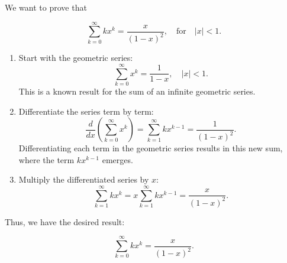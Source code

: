     \begin{example}
        We want to prove that

        \[
        \sum_{k=0}^{\infty} k x^k = \frac{x}{(1-x)^2}, \quad \text{for} \quad |x| < 1.
        \]

        \begin{enumerate}
            \item Start with the geometric series:
            \[
            \sum_{k=0}^{\infty} x^k = \frac{1}{1-x}, \quad |x| < 1.
            \]
            This is a known result for the sum of an infinite geometric series.

            \item Differentiate the series term by term:
            \[
            \frac{d}{dx} \left( \sum_{k=0}^{\infty} x^k \right) = \sum_{k=1}^{\infty} k x^{k-1} = \frac{1}{(1-x)^2}.
            \]
            Differentiating each term in the geometric series results in this new sum, where the term \( k x^{k-1} \) emerges.

            \item Multiply the differentiated series by \( x \):
            \[
            \sum_{k=1}^{\infty} k x^k = x \sum_{k=1}^{\infty} k x^{k-1} = \frac{x}{(1-x)^2}.
            \]
        \end{enumerate}

        Thus, we have the desired result:

        \[
        \sum_{k=0}^{\infty} k x^k = \frac{x}{(1-x)^2}.
        \]
    \end{example}

